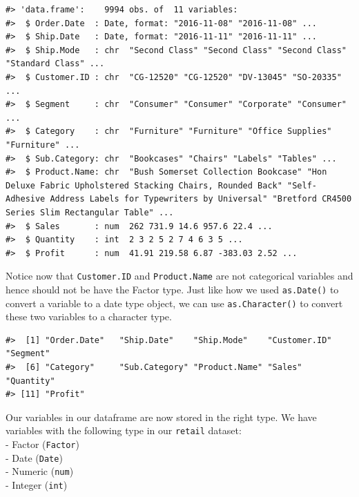 \documentclass[]{article}
\newenvironment{Shaded}{\begin{snugshade}}{\end{snugshade}}
\newcommand{\KeywordTok}[1]{\textcolor[rgb]{0.13,0.29,0.53}{\textbf{#1}}}
\newcommand{\NormalTok}[1]{#1}
\newcommand{\OperatorTok}[1]{\textcolor[rgb]{0.81,0.36,0.00}{\textbf{#1}}}
\newcommand{\StringTok}[1]{\textcolor[rgb]{0.31,0.60,0.02}{#1}}
\begin{document}
\begin{verbatim}
#> 'data.frame':    9994 obs. of  11 variables:
#>  $ Order.Date  : Date, format: "2016-11-08" "2016-11-08" ...
#>  $ Ship.Date   : Date, format: "2016-11-11" "2016-11-11" ...
#>  $ Ship.Mode   : chr  "Second Class" "Second Class" "Second Class" "Standard Class" ...
#>  $ Customer.ID : chr  "CG-12520" "CG-12520" "DV-13045" "SO-20335" ...
#>  $ Segment     : chr  "Consumer" "Consumer" "Corporate" "Consumer" ...
#>  $ Category    : chr  "Furniture" "Furniture" "Office Supplies" "Furniture" ...
#>  $ Sub.Category: chr  "Bookcases" "Chairs" "Labels" "Tables" ...
#>  $ Product.Name: chr  "Bush Somerset Collection Bookcase" "Hon Deluxe Fabric Upholstered Stacking Chairs, Rounded Back" "Self-Adhesive Address Labels for Typewriters by Universal" "Bretford CR4500 Series Slim Rectangular Table" ...
#>  $ Sales       : num  262 731.9 14.6 957.6 22.4 ...
#>  $ Quantity    : int  2 3 2 5 2 7 4 6 3 5 ...
#>  $ Profit      : num  41.91 219.58 6.87 -383.03 2.52 ...
\end{verbatim}

Notice now that \texttt{Customer.ID} and \texttt{Product.Name} are not
categorical variables and hence should not be have the Factor type. Just
like how we used \texttt{as.Date()} to convert a variable to a date type
object, we can use \texttt{as.Character()} to convert these two
variables to a character type.

\begin{Shaded}
\end{Shaded}

\begin{verbatim}
#>  [1] "Order.Date"   "Ship.Date"    "Ship.Mode"    "Customer.ID"  "Segment"     
#>  [6] "Category"     "Sub.Category" "Product.Name" "Sales"        "Quantity"    
#> [11] "Profit"
\end{verbatim}

Our variables in our dataframe are now stored in the right type. We have
variables with the following type in our \texttt{retail} dataset:\\
- Factor (\texttt{Factor})\\
- Date (\texttt{Date})\\
- Numeric (\texttt{num})\\
- Integer (\texttt{int})
\end{document}
